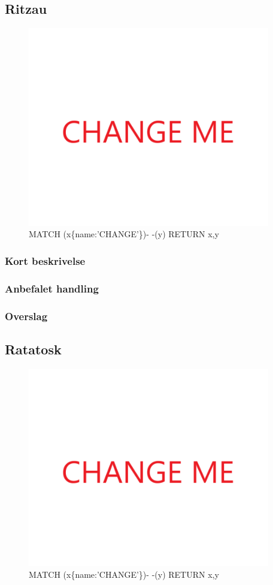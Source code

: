 \documentclass{article}
\begin{document}
\subsection{Ritzau}
\begin{figure}[h]
\includegraphics[width=300pt]{CHANGE.PNG}
\caption{MATCH (x\{name:'CHANGE'\})- -(y) RETURN x,y}
\end{figure}
\subsubsection{Kort beskrivelse}
\subsubsection{Anbefalet handling}
\subsubsection{Overslag}
\subsection{Ratatosk}
\begin{figure}[h]
\includegraphics[width=300pt]{CHANGE.PNG}
\caption{MATCH (x\{name:'CHANGE'\})- -(y) RETURN x,y}
\end{figure}
\end{document}
